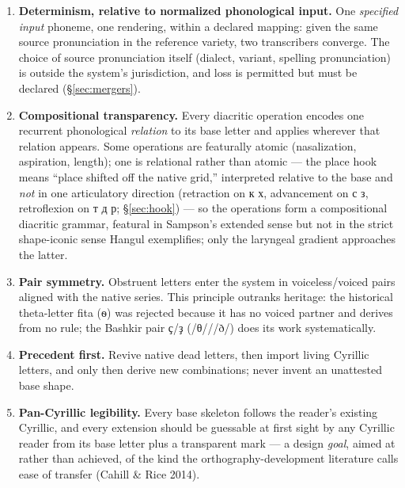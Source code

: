 \documentclass[12pt]{article}
\newcommand{\cz}[1]{{\chu #1}}
\newcommand{\ph}[1]{{\ipafont/#1/}}
\begin{document}
\begin{enumerate}
\item \textbf{Determinism, relative to normalized phonological input.} One \emph{specified input} phoneme, one rendering, within a declared mapping: given the same source pronunciation in the reference variety, two transcribers converge. The choice of source pronunciation itself (dialect, variant, spelling pronunciation) is outside the system's jurisdiction, and loss is permitted but must be declared (\S\ref{sec:mergers}).
\item \textbf{Compositional transparency.} Every diacritic operation encodes one recurrent phonological \emph{relation} to its base letter and applies wherever that relation appears. Some operations are featurally atomic (nasalization, aspiration, length); one is relational rather than atomic — the place hook means ``place shifted off the native grid,'' interpreted relative to the base and \emph{not} in one articulatory direction (retraction on \cz{к х}, advancement on \cz{с з}, retroflexion on \cz{т д р}; \S\ref{sec:hook}) — so the operations form a compositional diacritic grammar, featural in Sampson's extended sense but not in the strict shape-iconic sense Hangul exemplifies; only the laryngeal gradient approaches the latter.
\item \textbf{Pair symmetry.} Obstruent letters enter the system in voiceless/voiced pairs aligned with the native series. This principle outranks heritage: the historical theta-letter fita (\cz{ѳ}) was rejected because it has no voiced partner and derives from no rule; the Bashkir pair \cz{ҫ}/\cz{ҙ} (\ph{θ}/\ph{ð}) does its work systematically.
\item \textbf{Precedent first.} Revive native dead letters, then import living Cyrillic letters, and only then derive new combinations; never invent an unattested base shape.
\item \textbf{Pan-Cyrillic legibility.} Every base skeleton follows the reader's existing Cyrillic, and every extension should be guessable at first sight by any Cyrillic reader from its base letter plus a transparent mark — a design \emph{goal}, aimed at rather than achieved, of the kind the orthography-development literature calls ease of transfer (Cahill \& Rice 2014).


\end{enumerate}
\end{document}
